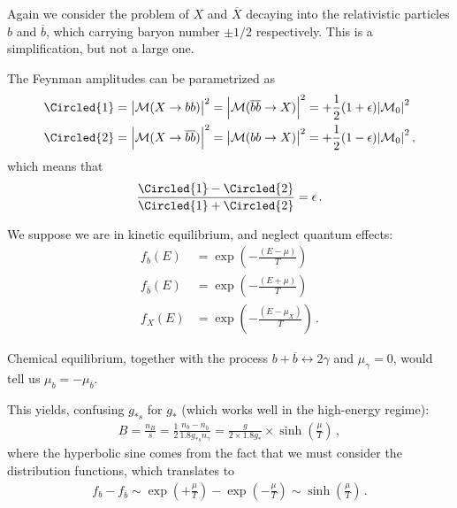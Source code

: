 \documentclass[main.tex]{subfiles}
\begin{document}

Again we consider the problem of \(X\) and \(\overline{X}\) decaying into the relativistic particles \(b\) and \(\overline{b}\), which carrying baryon number \(\pm 1/2 \) respectively. This is a simplification, but not a large one.

The Feynman amplitudes can be parametrized as 
%
\begin{align}
\Circled{1} = \abs{\mathcal{M}(X \to b b )}^2 
&= \abs{\mathcal{M}(\overline{b} \overline{b} \to X )}^2 =
+ \frac{1}{2} (1 + \epsilon ) \abs{\mathcal{M}_0}^2 \\
\Circled{2} 
= \abs{\mathcal{M}(X \to \overline{b} \overline{b} )}^2 
&= \abs{\mathcal{M}(b b \to X )}^2 =
+ \frac{1}{2} (1 - \epsilon ) \abs{\mathcal{M}_0}^2 
\,,
\end{align}
%
which means that  
%
\begin{align}
\frac{\Circled{1} - \Circled{2}}{\Circled{1} + \Circled{2}} = \epsilon 
\,.
\end{align}

We suppose we are in kinetic equilibrium, and neglect quantum effects: 
%
\begin{align}
f_b (E) &= \exp(- \frac{(E-\mu )}{T})  \\
f_{\overline{b}} (E) &= \exp(- \frac{(E + \mu )}{T}) \\
f_{X} (E) &= \exp(- \frac{(E - \mu_X )}{T}) 
\,.
\end{align}

Chemical equilibrium, together with the process \(b + \overline{b} \leftrightarrow 2 \gamma \) and \(\mu _\gamma = 0\), would tell us \(\mu _b = - \mu _{\overline{b}}\).

This yields, confusing \(g_{*s}\) for \(g_*\) (which works well in the high-energy regime):
%
\begin{align}
B = \frac{n_B}{s} =  \frac{1}{2 }\frac{n_b - n_{\overline{b}}}{\num{1.8} g_{*s} n_\gamma } =
\frac{g}{2 \times \num{1.8} g_*} \times \sinh( \frac{\mu}{T} )
\,,
\end{align}
%
where the hyperbolic sine comes from the fact that we must consider the distribution functions, which translates to 
%
\begin{align}
f_b - f_{\overline{b}} \sim 
\exp(+ \frac{\mu}{T}) - \exp(- \frac{\mu }{T}) \sim \sinh(\frac{\mu}{T})
\,.
\end{align}
\end{document}

